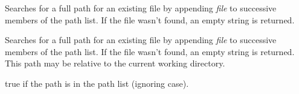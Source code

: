 

Searches for a full path for an existing file by appending {\it file} to
successive members of the path list.  If the file wasn't found, an empty
string is returned.




Searches for a full path for an existing file by appending {\it file} to
successive members of the path list.  If the file wasn't found, an empty string
is returned. This path may be relative to the current working directory.


\label{wxpathlistmember}


true if the path is in the path list (ignoring case).

